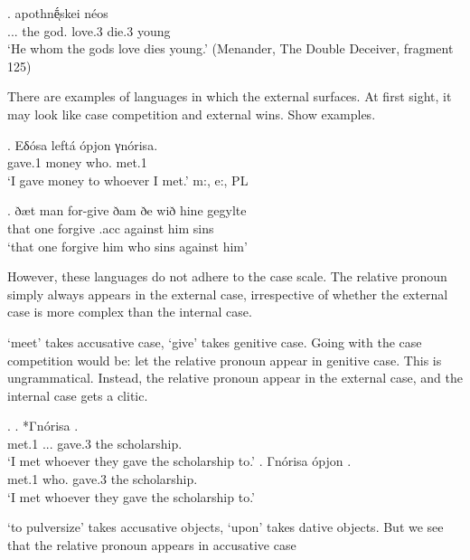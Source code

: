 \exg.     apothnḗͅskei néos\\
... the god. love.3 die.3 young\\
`He whom the gods love dies young.' (Menander, The Double Deceiver, fragment 125)\label{ex:ancient-greek}

There are examples of languages in which the external surfaces. At first sight, it may look like case competition and external wins. Show examples.

\exg. Eδósa leftá ópjon γnórisa.\\
gave.1 money who. met.1\\
`I gave money to whoever I met.' \hfill m:, e:, PL

\exg. ðæt man for-give ðam ðe wið hine gegylte\\
 that one forgive .\ac{acc}  against him sins\\
 `that one forgive him who sins against him'\citep{harbert1983}

However, these languages do not adhere to the case scale. The relative pronoun simply always appears in the external case, irrespective of whether the external case is more complex than the internal case.

`meet' takes accusative case, `give' takes genitive case. Going with the case competition would be: let the relative pronoun appear in genitive case. This is ungrammatical. Instead, the relative pronoun appear in the external case, and the internal case gets a clitic.

\ex.
\ag. *Γnórisa    .\\
met.1 ... gave.3 the scholarship.\\
`I met whoever they gave the scholarship to.'
\bg. Γnórisa ópjon    .\\
met.1 who.  gave.3 the scholarship.\\
`I met whoever they gave the scholarship to.'

 `to pulversize' takes accusative objects,  `upon' takes dative objects. But we see that the relative pronoun appears in accusative case

